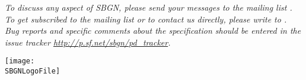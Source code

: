 \begin{titlingpage}
\begin{center}

\vfill

\normalsize
\begin{minipage}{5in}
  \emph{To discuss any aspect of SBGN, please send your messages
    to the mailing list .  To get
    subscribed to the mailing list or to contact us directly,
    please write to . Bug reports and specific comments about the specification should be entered in the issue tracker \url{http://p.sf.net/sbgn/pd_tracker}.}
\end{minipage}

\vfill

\centerline{\texttt{[image: \\SBGNLogoFile]}}

\end{center}

\end{titlingpage}

%
%

\setcounter{page}{2}


